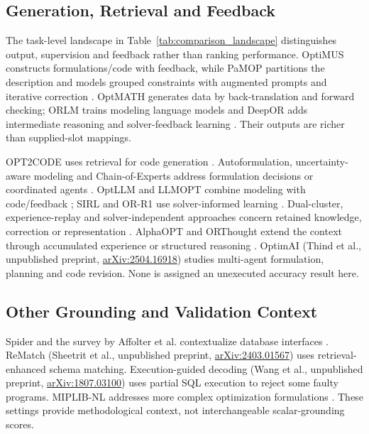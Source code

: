 \subsection{Generation, Retrieval and Feedback}
The task-level landscape in Table~\ref{tab:comparison_landscape} distinguishes output, supervision and feedback rather than ranking performance. OptiMUS constructs formulations/code with feedback, while PaMOP partitions the description and models grouped constraints with augmented prompts and iterative correction \cite{ahmaditeshnizi2024optimus_icml,pan2025pamop}. OptMATH generates data by back-translation and forward checking; ORLM trains modeling language models and DeepOR adds intermediate reasoning and solver-feedback learning \cite{lu2025optmath,huang2025orlm,xiao2026deepor}. Their outputs are richer than supplied-slot mappings.

OPT2CODE uses retrieval for code generation \cite{ahmed2025opt2code}. Autoformulation, uncertainty-aware modeling and Chain-of-Experts address formulation decisions or coordinated agents \cite{astorga2025autoformulation,yu2026uncertainty,xiao2024chainofexperts}. OptLLM and LLMOPT combine modeling with code/feedback \cite{zhang2024optllm,jiang2025llmopt}; SIRL and OR-R1 use solver-informed learning \cite{chen2025solver,ding2026orr1}. Dual-cluster, experience-replay and solver-independent approaches concern retained knowledge, correction or representation \cite{zhang2026dual,xie2026escaping,li2026solver}. AlphaOPT and ORThought extend the context through accumulated experience or structured reasoning \cite{kong2025alphaopt,yang2026orthought}. OptimAI (Thind et al., unpublished preprint, \href{https://arxiv.org/abs/2504.16918}{arXiv:2504.16918}) studies multi-agent formulation, planning and code revision. None is assigned an unexecuted accuracy result here.

\subsection{Other Grounding and Validation Context}
Spider and the survey by Affolter et al. contextualize database interfaces \cite{yu2018spider,affolter2019nli}. ReMatch (Sheetrit et al., unpublished preprint, \href{https://arxiv.org/abs/2403.01567}{arXiv:2403.01567}) uses retrieval-enhanced schema matching. Execution-guided decoding (Wang et al., unpublished preprint, \href{https://arxiv.org/abs/1807.03100}{arXiv:1807.03100}) uses partial SQL execution to reject some faulty programs. MIPLIB-NL addresses more complex optimization formulations \cite{miplibnl2026}. These settings provide methodological context, not interchangeable scalar-grounding scores.
